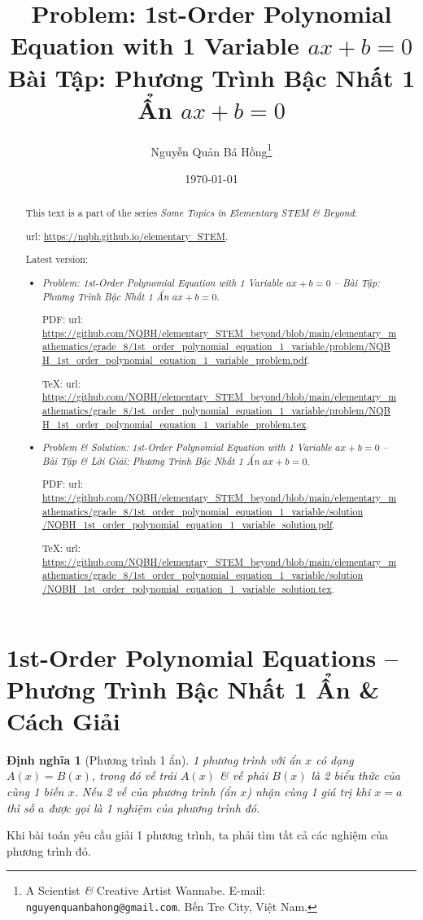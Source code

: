 \documentclass{article}
\title{Problem: 1st-Order Polynomial Equation with 1 Variable $ax + b = 0$\\Bài Tập: Phương Trình Bậc Nhất 1 Ẩn $ax + b = 0$}
\author{Nguyễn Quản Bá Hồng\footnote{A Scientist {\it\&} Creative Artist Wannabe. E-mail: {\tt nguyenquanbahong@gmail.com}. Bến Tre City, Việt Nam.}}
\date{\today}
\newtheorem{dinhnghia}{Định nghĩa}
\begin{document}
\maketitle
\begin{abstract}
	This text is a part of the series {\it Some Topics in Elementary STEM \& Beyond}:
	
	{\sc url}: \url{https://nqbh.github.io/elementary_STEM}.
	
	Latest version:
	\begin{itemize}
		\item {\it Problem: 1st-Order Polynomial Equation with 1 Variable $ax + b = 0$ -- Bài Tập: Phương Trình Bậc Nhất 1 Ẩn $ax + b = 0$}.
		
		PDF: {\sc url}: \url{https://github.com/NQBH/elementary_STEM_beyond/blob/main/elementary_mathematics/grade_8/1st_order_polynomial_equation_1_variable/problem/NQBH_1st_order_polynomial_equation_1_variable_problem.pdf}.
		
		\TeX: {\sc url}: \url{https://github.com/NQBH/elementary_STEM_beyond/blob/main/elementary_mathematics/grade_8/1st_order_polynomial_equation_1_variable/problem/NQBH_1st_order_polynomial_equation_1_variable_problem.tex}.
		\item {\it Problem \& Solution: 1st-Order Polynomial Equation with 1 Variable $ax + b = 0$ -- Bài Tập \& Lời Giải: Phương Trình Bậc Nhất 1 Ẩn $ax + b = 0$}.
		
		PDF: {\sc url}: \url{https://github.com/NQBH/elementary_STEM_beyond/blob/main/elementary_mathematics/grade_8/1st_order_polynomial_equation_1_variable/solution /NQBH_1st_order_polynomial_equation_1_variable_solution.pdf}.
		
		\TeX: {\sc url}: \url{https://github.com/NQBH/elementary_STEM_beyond/blob/main/elementary_mathematics/grade_8/1st_order_polynomial_equation_1_variable/solution /NQBH_1st_order_polynomial_equation_1_variable_solution.tex}.
	\end{itemize}
\end{abstract}
\tableofcontents
\newpage


\section{1st-Order Polynomial Equations -- Phương Trình Bậc Nhất 1 Ẩn \& Cách Giải}

\begin{dinhnghia}[Phương trình 1 ẩn]
	1 phương trình với ẩn $x$ có dạng $A(x) = B(x)$, trong đó \emph{vế trái} $A(x)$ \& \emph{vế phải} $B(x)$ là 2 biểu thức của cùng 1 biến $x$. Nếu 2 vế của phương trình (ẩn $x$) nhận cùng 1 giá trị khi $x = a$ thì số $a$ được gọi là 1 \emph{nghiệm} của phương trình đó.
\end{dinhnghia}
Khi bài toán yêu cầu giải 1 phương trình, ta phải tìm tất cả các nghiệm của phương trình đó.
\end{document}
